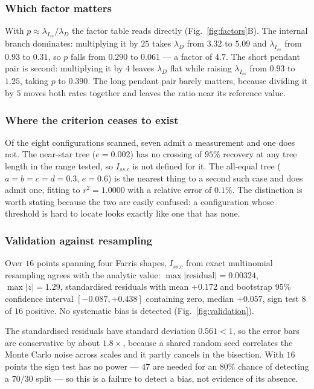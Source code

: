 \documentclass[preprint,12pt,authoryear]{elsarticle}
\newcommand{\Iss}{I_{ss}}
\newcommand{\Issc}{I_{ss.c}}
\newcommand{\lam}[1]{\lambda_{#1}}
\theoremstyle{definition}
\theoremstyle{remark}
\begin{document}
\subsubsection{Which factor matters}

With $p\approx\lam{\Iss}/\lam D$ the factor table reads directly
(Fig.~\ref{fig:factors}B). The
internal branch dominates: multiplying it by $25$ takes $\lam D$ from
$3.32$ to $5.09$ and $\lam{\Iss}$ from $0.93$ to $0.31$, so $p$ falls from
$0.290$ to $0.061$ --- a factor of $4.7$. The short pendant pair is second:
multiplying it by $4$ leaves $\lam D$ flat while raising $\lam{\Iss}$ from
$0.93$ to $1.25$, taking $p$ to $0.390$. The long pendant pair barely
matters, because dividing it by $5$ moves both rates together and leaves the
ratio near its reference value.

\subsubsection{Where the criterion ceases to exist}

Of the eight configurations scanned, seven admit a measurement and one does
not. The near-star tree ($e=0.002$) has no crossing of $95\%$ recovery at any
tree length in the range tested, so $\Issc$ is not defined for it. The
all-equal tree ($a=b=c=d=0.3$, $e=0.6$) is the nearest thing to a second such
case and does admit one, fitting to $r^2=1.0000$ with a relative error of
$0.1\%$. The distinction is worth stating because the two are easily
confused: a configuration whose threshold is hard to locate looks exactly
like one that has none.

\subsubsection{Validation against resampling}
\label{sec:valid}

Over $16$ points spanning four Farris shapes, $\Issc$ from exact multinomial
resampling agrees with the analytic value: $\max|\text{residual}|=0.00324$,
$\max|z|=1.29$, standardised residuals with mean $+0.172$ and bootstrap
$95\%$ confidence interval $[-0.087,+0.438]$ containing zero, median
$+0.057$, sign test $8$ of $16$ positive. No systematic bias is detected
(Fig.~\ref{fig:validation}).

The standardised residuals have standard deviation $0.561<1$, so the error
bars are conservative by about $1.8\times$, because a shared random seed
correlates the Monte Carlo noise across scales and it partly cancels in the
bisection. With $16$ points the sign test has no power --- $47$ are needed
for an $80\%$ chance of detecting a $70/30$ split --- so this is a failure to
detect a bias, not evidence of its absence.
\end{document}
